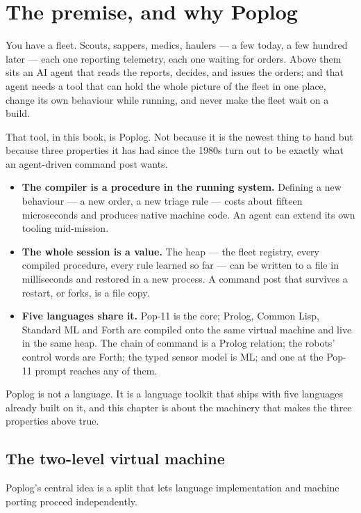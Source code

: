 \chapter{The premise, and why Poplog}

You have a fleet. Scouts, sappers, medics, haulers --- a few today, a few
hundred later --- each one reporting telemetry, each one waiting for orders.
Above them sits an AI agent that reads the reports, decides, and issues the
orders; and that agent needs a tool that can hold the whole picture of the
fleet in one place, change its own behaviour while running, and never make
the fleet wait on a build.

That tool, in this book, is Poplog. Not because it is the newest thing to hand
but because three properties it has had since the 1980s turn out to be
exactly what an agent-driven command post wants.

\begin{itemize}
\item \textbf{The compiler is a procedure in the running system.} Defining a
  new behaviour --- a new order, a new triage rule --- costs about fifteen
  microseconds and produces native machine code. An agent can extend its own
  tooling mid-mission.
\item \textbf{The whole session is a value.} The heap --- the fleet registry,
  every compiled procedure, every rule learned so far --- can be written to
  a file in milliseconds and restored in a new process. A command post that
  survives a restart, or forks, is a file copy.
\item \textbf{Five languages share it.} Pop-11 is the core; Prolog, Common
  Lisp, Standard ML and Forth are compiled onto the same virtual machine and
  live in the same heap. The chain of command is a Prolog relation; the
  robots' control words are Forth; the typed sensor model is ML; and one
   at the Pop-11 prompt reaches any of them.
\end{itemize}

Poplog is not a language. It is a language toolkit that ships with five
languages already built on it, and this chapter is about the machinery that
makes the three properties above true.

\section{The two-level virtual machine}

Poplog's central idea is a split that lets language implementation and
machine porting proceed independently.

